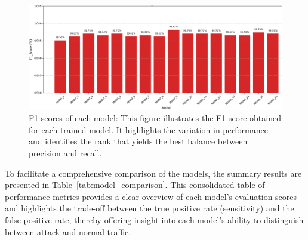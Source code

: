 \documentclass[pdflatex,sn-mathphys-num]{sn-jnl}
\theoremstyle{thmstyleone}
\theoremstyle{thmstyletwo}
\theoremstyle{thmstylethree}
\begin{document}
\begin{figure}[H]
    \centering
    \includegraphics[width=1\linewidth]{F1-score.png}
    \caption{F1-scores of each model: This figure illustrates the F1-score obtained for each trained model. It highlights the variation in performance and identifies the rank that yields the best balance between precision and recall.}
    \label{fig:f1}
\end{figure}
To facilitate a comprehensive comparison of the models, the summary results are presented in Table~\ref{tab:model_comparison}. This consolidated table of performance metrics provides a clear overview of each model’s evaluation scores and highlights the trade-off between the true positive rate (sensitivity) and the false positive rate, thereby offering insight into each model’s ability to distinguish between attack and normal traffic.
\end{document}

